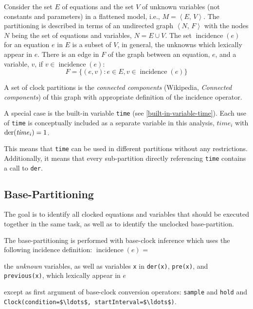 Consider the set $E$ of equations and the set $V$ of unknown variables (not constants and parameters) in a flattened model, i.e., $M = \left\langle E,\, V \right\rangle$.
The partitioning is described in terms of an undirected graph $\left\langle N,\, F \right\rangle$ with the nodes $N$ being the set of equations and variables, $N = E \cup V$.
The set $\operatorname{incidence}(e)$ for an equation $e$ in $E$ is a subset of $V$, in general, the unknowns which lexically appear in $e$.
There is an edge in $F$ of the graph between an equation, $e$, and a variable, $v$, if $v \in \operatorname{incidence}(e)$:
\begin{equation*}
F = \{(e, v) : e \in E, v \in \operatorname{incidence}(e)\}
\end{equation*}

A set of clock partitions is the \emph{connected components} (Wikipedia,
\emph{Connected components}) of this graph with appropriate definition of
the incidence operator.

A special case is the built-in variable \lstinline!time! (see \cref{built-in-variable-time}).
Each use of \lstinline!time! is conceptually included as a separate variable in this analysis, $\mathit{time}_i$ with $\text{\lstinline!der!}(\mathit{time}_{i}) = 1$.
\begin{nonnormative}
This means that \lstinline!time! can be used in different partitions without any restrictions.
Additionally, it means that every sub-partition directly referencing \lstinline!time! contains a call to \lstinline!der!.
\end{nonnormative}

\subsection{Base-Partitioning}\label{base-clock-partitioning}

The goal is to identify all clocked equations and variables that should be executed together in the same task, as well as to identify the unclocked base-partition.

The base-partitioning is performed with base-clock inference which uses the following incidence definition:
$\operatorname{incidence}(e)$ =
\begin{list}{}{\setlength{\leftmargin}{2em}\setlength{\topsep}{-\parskip}}
\item
the \emph{unknown} variables, as well as variables \lstinline!x! in \lstinline!der(x)!, \lstinline!pre(x)!, and \lstinline!previous(x)!, which lexically appear in $e$
\begin{list}{}{\setlength{\leftmargin}{2em}\setlength{\topsep}{-\parskip}}
\item
except as first argument of base-clock conversion operators: \lstinline!sample! and \lstinline!hold! and \lstinline!Clock(condition=$\ldots$, startInterval=$\ldots$)!.
\end{list}
\end{list}\vspace{\parskip}%

